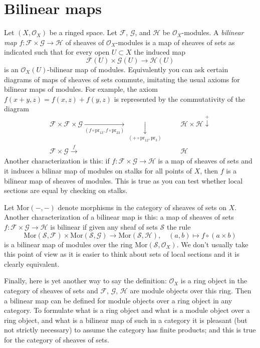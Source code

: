 \section{Bilinear maps}
\label{modules-section-bilinear}
Let $(X, \mathcal{O}_X)$ be a ringed space.
Let $\mathcal{F}$, $\mathcal{G}$, and $\mathcal{H}$ be $\mathcal{O}_X$-modules.
A {\it bilinear map} $f : \mathcal{F} \times \mathcal{G} \to \mathcal{H}$
of sheaves of $\mathcal{O}_X$-modules is a map of sheaves of sets as indicated
such that for every open $U \subset X$ the induced map
$$
\mathcal{F}(U) \times \mathcal{G}(U) \to \mathcal{H}(U)
$$
is an $\mathcal{O}_X(U)$-bilinear map of modules. Equivalently you can ask
certain diagrams of maps of sheaves of sets commute, imitating the usual
axioms for bilinear maps of modules. For example, the axiom
$f(x + y, z) = f(x, z) + f(y, z)$ is represented by the commutativity
of the diagram
$$
\begin{array}{cccc}\mathcal{F} \times \mathcal{F} \times \mathcal{G}
\underset{(f \circ \text{pr}_{13}, f \circ \text{pr}_{23})}{\longrightarrow}\underset{(+ \circ \text{pr}_{12}, \text{pr}_3)}{\downarrow} &  &  & \mathcal{H} \times \mathcal{H}
\overset{+}{\downarrow} \\ \mathcal{F} \times \mathcal{G} \overset{f}{\longrightarrow} &  &  & \mathcal{H}\end{array}
$$
Another characterization is this: if
$f : \mathcal{F} \times \mathcal{G} \to \mathcal{H}$
is a map of sheaves of sets and
it induces a bilinar map of modules on stalks for all points of $X$, then
$f$ is a bilinear map of sheaves of modules. This is true as you can test
whether local sections are equal by checking on stalks.

\medskip\noindent
Let $\text{Mor}( - , - )$ denote morphisms in the category of sheaves of
sets on $X$. Another characterization of a bilinear map is this:
a map of sheaves of sets
$f : \mathcal{F} \times \mathcal{G} \to \mathcal{H}$
is bilinear if given any sheaf of sets $\mathcal{S}$ the rule
$$
\text{Mor}(\mathcal{S}, \mathcal{F}) \times
\text{Mor}(\mathcal{S}, \mathcal{G}) \to
\text{Mor}(\mathcal{S}, \mathcal{H}),\quad
(a, b) \mapsto f \circ (a \times b)
$$
is a bilinear map of modules over the ring
$\text{Mor}(\mathcal{S}, \mathcal{O}_X)$.
We don't usually take this point of view as it is easier to think about
sets of local sections and it is clearly equivalent.

\medskip\noindent
Finally, here is yet another way to say the definition:
$\mathcal{O}_X$ is a ring object in the category of sheaves of sets
and $\mathcal{F}$, $\mathcal{G}$, $\mathcal{H}$ are module objects
over this ring. Then a bilinear map can be defined for module objects
over a ring object in any category.
To formulate what is a ring object and what is a module object
over a ring object, and what is a bilinear map of such in a
category it is pleasant (but not strictly necessary)
to assume the category has finite products; and
this is true for the category of sheaves of sets.

